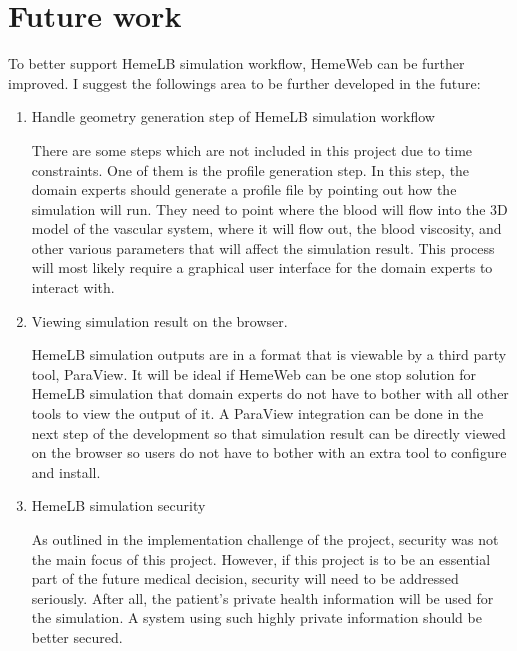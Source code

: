  

\chapter[Future work]{Future work}

To better support HemeLB simulation workflow, HemeWeb can be further improved. I suggest the followings area to be further developed in the future:

\begin{enumerate}
	\item Handle geometry generation step of HemeLB simulation workflow
	
	There are some steps which are not included in this project due to time constraints. One of them is the profile generation step. In this step, the domain experts should generate a profile file by pointing out how the simulation will run. They need to point where the blood will flow into the 3D  model of the vascular system, where it will flow out, the blood viscosity, and other various parameters that will affect the simulation result. This process will most likely require a graphical user interface for the domain experts to interact with.
	
	\item Viewing simulation result on the browser.
	
	HemeLB simulation outputs are  in a format that is viewable by a third party tool, ParaView. It will be ideal if HemeWeb can be one stop solution for HemeLB simulation that domain experts do not have to bother with all other tools to view the output of it. A ParaView integration can be done in the next step of the development so that simulation result can be directly viewed on the browser so users do not have to bother with an extra tool to configure and install.
	
	\item HemeLB simulation security
	
	As outlined in the implementation challenge of the project, security was not the main focus of this project. However, if this project is to be an essential part of the future medical decision, security will need to be addressed seriously. After all, the patient's private health information will be used for the simulation. A system using such highly private information should be better secured.
	

\end{enumerate}
